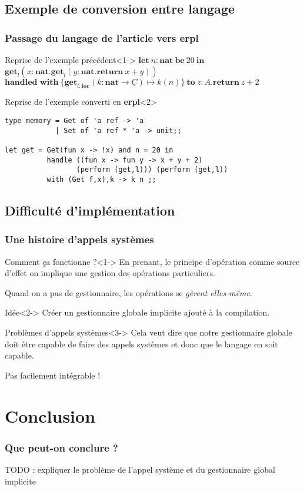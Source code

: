 \documentclass{beamer}
\begin{document}
\subsection{Exemple de conversion entre langage}
\begin{frame}[fragile]
	\frametitle{Passage du langage de l'article vers \textbf{erpl}}

	\begin{exampleblock}{Reprise de l'exemple précédent}<1->
		$\textbf{let}~n:\textbf{nat}~\textbf{be}~20~\textbf{in}$\\
		$\textbf{get}_l(x:\textbf{nat}.\textbf{get}_l(y:\textbf{nat}.\textbf{return}~x+y))$\\
		$\textbf{handled~with}~\{\textbf{get}_{l:\textbf{loc}}(k:\textbf{nat} \rightarrow \underline{C}) \mapsto k(n)\}~\textbf{to}~z:A.\textbf{return}~z+2$
	\end{exampleblock}

	\begin{exampleblock}{Reprise de l'exemple converti en \textbf{erpl}}<2>

		\begin{lstlisting}[language=caml]
type memory = Get of 'a ref -> 'a 
            | Set of 'a ref * 'a -> unit;;

let get = Get(fun x -> !x) and n = 20 in
          handle ((fun x -> fun y -> x + y + 2) 
                 (perform (get,l))) (perform (get,l)) 
          with (Get f,x),k -> k n ;;
		\end{lstlisting}
	\end{exampleblock}
\end{frame}

\subsection{Difficulté d'implémentation}
\begin{frame}
	\frametitle{Une histoire d'appels systèmes}
	\begin{block}{Comment ça fonctionne ?}<1->
		En prenant, le principe d'opération comme source d'effet on implique une gestion des opérations particuliers.

		Quand on a pas de gestionnaire, les opérations se \textit{gèrent elles-même}.
	\end{block}

	\begin{block}{Idée}<2->
		Créer un gestionnaire globale implicite ajouté à la compilation. 
	\end{block}

	\begin{alertblock}{Problèmes d'appels systèmes}<3->
		Cela veut dire que notre
		gestionnaire globale doit être capable de faire des appels systèmes et donc que le langage en soit capable.

		\alert{Pas facilement intégrable !}
	\end{alertblock}
\end{frame}

\section{Conclusion}
\begin{frame}
	\frametitle{Que peut-on conclure ?}
	TODO : expliquer le problème de l'appel système et du gestionnaire global implicite

	
\end{frame}
\end{document}
